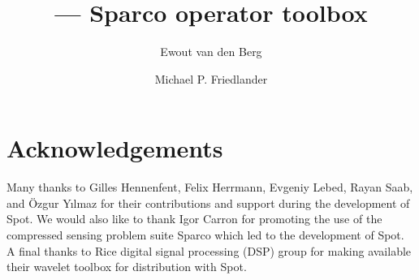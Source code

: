 \documentclass[oneside,11pt]{book}
\title{{\sc{spot}} --- Sparco operator toolbox}
\author{Ewout van den Berg \and Michael P. Friedlander}
\newcommand{\sparco}{Sparco}
\newcommand{\spot}{Spot}
\begin{document}
\maketitle
\tableofcontents






\chapter*{Acknowledgements}

Many thanks to Gilles Hennenfent, Felix Herrmann, Evgeniy Lebed, Rayan
Saab, and \"{O}zgur Y{\i{}}lmaz for their contributions and support
during the development of \spot{}. We would also like to thank Igor
Carron for promoting the use of the compressed sensing problem suite
\sparco{} which led to the development of \spot{}. A final thanks to
Rice digital signal processing (DSP) group for making available their
wavelet toolbox for distribution with \spot{}.


\appendix




\end{document}
